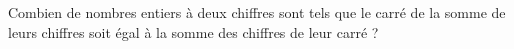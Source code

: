 Combien de nombres entiers à deux chiffres sont tels que le carré de la
somme de leurs chiffres soit égal à la somme des chiffres de leur carré ?